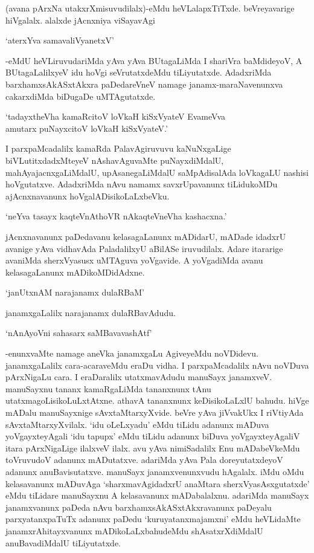 (avana pArxNa utakxrXmisuvudilalx)-eMdu heVLalapxTiTxde. beVreyavarige hiVgalalx. alalxde jAcnxniya viSayavAgi

\begin{shloka}
`aterxYva samavaliVyanetxV'
\end{shloka}

-eMdU heVLiruvudariMda yAva yAva BUtagaLiMda I shariVra baMdideyoV, A BUtagaLalilxyeV idu hoVgi seVrutatxdeMdu tiLiyutatxde. AdadxriMda barxhamxsAkASxtAkxra paDedareVneV namage janamx-maraNavenunxva cakarxdiMda biDugaDe uMTAgutatxde.

\begin{shloka}
`tadayxtheVha kamaRcitoV loVkaH kiSxVyateV EvameVva\\
amutarx puNayxcitoV loVkaH kiSxVyateV.'
\end{shloka}

I parxpaMcadalilx kamaRda PalavAgiruvuvu kaNuNxgaLige biVLutitxdadxMteyeV nAshavAguvaMte puNayxdiMdalU, mahAyajacnxgaLiMdalU, upAsanegaLiMdalU saMpAdisalAda loVkagaLU nashisi hoVgutatxve. AdadxriMda nAvu namamx savxrUpavanunx tiLidukoMDu ajAcnxnavanunx hoVgalADisikoLaLxbeVku.

\begin{shloka}
`neYva tasayx kaqteVnAthoVR nAkaqteVneVha kashacxna.'
\end{shloka}

jAcnxnavanunx paDedavanu kelasagaLanunx mADidarU, mADade idadxrU avanige yAva vidhavAda PaladalilxyU aBilASe iruvudilalx. Adare itararige avaniMda sherxVyasusx uMTAguva yoVgavide. A yoVgadiMda avanu kelasagaLanunx mADikoMDidAdxne.

\begin{shloka}
`janUtxnAM narajanamx dulaRBaM'
\end{shloka}

janamxgaLalilx narajanamx dulaRBavAdudu.

\begin{shloka}
`nAnAyoVni sahasarx saMBavavashAtf'
\end{shloka}

-enunxvaMte namage aneVka janamxgaLu AgiveyeMdu noVDidevu. janamxgaLalilx cara-acaraveMdu eraDu vidha. I parxpaMcadalilx nAvu noVDuva pArxNigaLu cara. I eraDaralilx utatxmavAdudu manuSayx janamxveV. manuSayxnu tananx kamaRgaLiMda tananxnunx tAnu utatxmagoLisikoLuLxtAtxne. athavA tananxnunx keDisikoLaLxlU bahudu. hiVge mADalu manuSayxnige sAvxtaMtarxyXvide. beVre yAva jiVvakUkx I riVtiyAda sAvxtaMtarxyXvilalx. `idu oLeLxyadu' eMdu tiLidu adanunx mADuva yoVgayxteyAgali `idu tapupx' eMdu tiLidu adanunx biDuva yoVgayxteyAgaliV itara pArxNigaLige ilalxveV ilalx. avu yAva nimiSadalilx Enu mADabeVkeMdu toVruvudoV adanunx mADutatxve. adariMda yAva Pala doreyutatxdeyoV adanunx anuBavisutatxve. manuSayx janamxvenunxvudu hAgalalx. iMdu oMdu kelasavanunx mADuvAga `sharxmavAgidadxrU anaMtara sherxVyasAsxgutatxde' eMdu tiLidare manuSayxnu A kelasavanunx mADabalalxnu. adariMda manuSayx janamxvanunx paDeda nAvu barxhamxsAkASxtAkxravanunx paDeyalu parxyatanxpaTuTx adanunx paDedu `kuruyatanxmajamxni' eMdu heVLidaMte janamxrAhitayxvanunx mADikoLaLxbahudeMdu shAsatxrXdiMdalU anuBavadiMdalU tiLiyutatxde.

